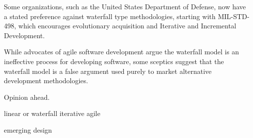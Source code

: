 Some organizations, such as the United States Department of Defense,
now have a stated preference against waterfall type methodologies,
starting with MIL-STD-498, which encourages evolutionary acquisition
and Iterative and Incremental Development.

While advocates of agile software development argue the waterfall
model is an ineffective process for developing software, some sceptics
suggest that the waterfall model is a false argument used purely to
market alternative development methodologies.


Opinion ahead.




linear or waterfall
iterative
agile

emerging design

